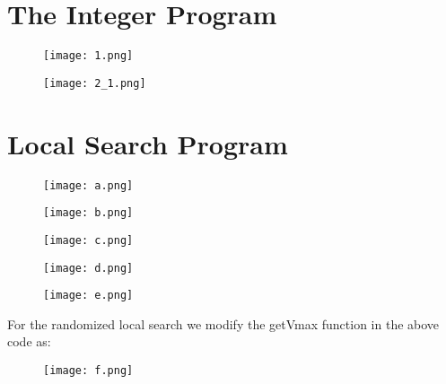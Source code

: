 \documentclass[12pt,a4paper,onecolumn]{article}
\begin{document}
\begin{appendices}
\section{The Integer Program}
\begin{center}

\begin{figure}[H]
 \texttt{[image: 1.png]}
  
  \label{Figure 2}
\end{figure}

\begin{figure}[H]
 \texttt{[image: 2\_1.png]}
  
  \label{Figure 3}
\end{figure}

\end{center}
\section{Local Search Program}
\begin{flushleft}
\begin{figure}[H]
 \texttt{[image: a.png]}
  
  \label{Figure 4}
\end{figure}

\begin{figure}[H]
 \texttt{[image: b.png]}
  
  \label{Figure 5}
\end{figure}

\begin{figure}[H]
 \texttt{[image: c.png]}
  
  \label{Figure 6}
\end{figure}
\begin{figure}[H]
 \texttt{[image: d.png]}
  
\end{figure}
\begin{figure}[H]
 \texttt{[image: e.png]}
  
\end{figure}
For the randomized local search we modify the getVmax function in the above code as:

\begin{figure}[H]
 \texttt{[image: f.png]}
  
\end{figure}
\end{flushleft}

\end{appendices}
\end{document}
